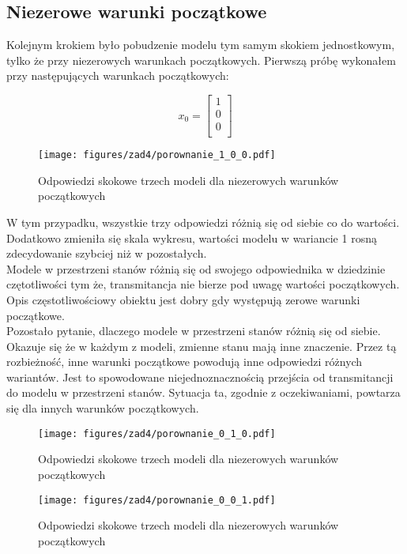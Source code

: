 \documentclass[a4paper,titlepage,11pt,floatssmall]{mwrep}
\begin{document}
\subsection{Niezerowe warunki początkowe}
\indent{} Kolejnym krokiem było pobudzenie modelu tym samym skokiem jednostkowym, tylko że przy niezerowych warunkach początkowych. Pierwszą próbę wykonałem przy następujących warunkach początkowych:
 
$$
x_0 =
\left[\begin{array}{c}
1 \\
0 \\
0 \\
\end{array} \right]
$$

\begin{figure}[H]
\centering
\texttt{[image: figures/zad4/porownanie\_1\_0\_0.pdf]}
\caption{Odpowiedzi skokowe trzech modeli dla niezerowych warunków początkowych}
\end{figure}

\indent{}W tym przypadku, wszystkie trzy odpowiedzi różnią się od siebie co do wartości. Dodatkowo zmieniła się skala wykresu, wartości modelu w wariancie 1 rosną zdecydowanie szybciej niż w pozostałych. \\
\indent{} Modele w przestrzeni stanów różnią się od swojego odpowiednika w dziedzinie czętotliwości tym że, transmitancja nie bierze pod uwagę wartości początkowych. Opis częstotliwościowy obiektu jest dobry gdy występują zerowe warunki początkowe.\\
\indent{} Pozostało pytanie, dlaczego modele w przestrzeni stanów różnią się od siebie. Okazuje się że w każdym z modeli, zmienne stanu mają inne znaczenie. Przez tą rozbieżność, inne warunki początkowe powodują inne odpowiedzi różnych wariantów. Jest to spowodowane niejednoznacznością przejścia od transmitancji do modelu w przestrzeni stanów. Sytuacja ta, zgodnie z oczekiwaniami, powtarza się dla innych warunków początkowych.

\newpage

\begin{figure}[H]
\centering
\texttt{[image: figures/zad4/porownanie\_0\_1\_0.pdf]}
\caption{Odpowiedzi skokowe trzech modeli dla niezerowych warunków początkowych}
\end{figure}

\begin{figure}[H]
\centering
\texttt{[image: figures/zad4/porownanie\_0\_0\_1.pdf]}
\caption{Odpowiedzi skokowe trzech modeli dla niezerowych warunków początkowych}
\end{figure}
\end{document}
